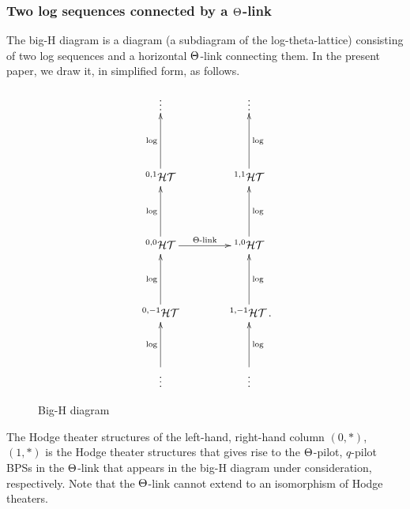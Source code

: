 \documentclass[12pt, reqno, a4paper]{amsart}
\begin{document}
\subsubsection{Two log sequences connected by a $\Th$-link}\label{subsub:BigHdiagram}
The big-H diagram is a diagram (a subdiagram of the log-theta-lattice) consisting of two log sequences and a horizontal \(\Th\)-link connecting them.
In the present paper, we draw it, in simplified form, as follows.
\begin{figure}[ht]
\begin{center}
\[
\xymatrix@C=40pt@R=45pt{
\vdots&\vdots\\
\HT[0,1]\ar[u]^-{\log} &
\HT[1,1]\ar[u]_-{\log} \\
\HT[0,0]\ar[r]^-{\Th\text{-link}}\ar[u]^-{\log} &
\HT[1,0]\ar[u]_-{\log} \\
\HT[0,-1]\ar[u]^-{\log}  &
\HT[1,-1]\rlap{.}\ar[u]_-{\log}\\
\vdots\ar[u]^-{\log}&\vdots\ar[u]_-{\log}
}
\]
\caption{Big-H diagram}
\label{fig:BigHdiagram}
\end{center}
\end{figure}
The Hodge theater structures of the left-hand, right-hand column $(0,\ast)$, $(1,\ast)$ is the Hodge theater structures that gives rise to the $\Th$-pilot, $q$-pilot BPSs in the $\Th$-link that appears in the big-H diagram under consideration, respectively.  Note that the $\Th$-link cannot extend to an isomorphism of Hodge theaters.  
\end{document}
